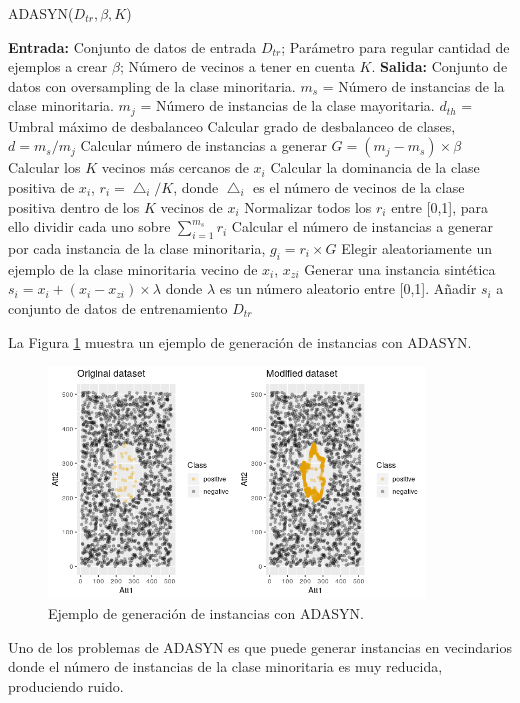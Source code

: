 \begin{algorithm}
	\caption{ADASYN($D_{tr}, \beta, K$)}
	\label{algo:adasyn}
	\begin{algorithmic}[0]
		\State \textbf{Entrada:} Conjunto de datos de entrada $D_{tr}$; Parámetro para regular cantidad de ejemplos a crear $\beta$; Número de vecinos a tener en cuenta $K$.
		\State \textbf{Salida:} Conjunto de datos con oversampling de la clase minoritaria.
		\State $m_s$ = Número de instancias de la clase minoritaria.
		\State $m_j$ = Número de instancias de la clase mayoritaria.
		\State $d_{th}$ = Umbral máximo de desbalanceo
		\State Calcular grado de desbalanceo de clases, $d = m_s/m_j$
			\State Calcular número de instancias a generar $G = (m_j - m_s) \times \beta$
				\State Calcular los $K$ vecinos más cercanos de $x_i$
				\State Calcular la dominancia de la clase positiva de $x_i$, $r_i = \bigtriangleup_i / K$, donde $\bigtriangleup_i$ es el número de vecinos de la clase positiva dentro de los $K$ vecinos de $x_i$
			\EndFor
			\State Normalizar todos los $r_i$ entre [0,1], para ello dividir cada uno sobre $\sum_{i=1}^{m_s} r_i$
			\State Calcular el número de instancias a generar por cada instancia de la clase minoritaria, $g_i = r_i \times G$
					\State Elegir aleatoriamente un ejemplo de la clase minoritaria vecino de $x_i$, $x_{zi}$
					\State Generar una instancia sintética $s_i = x_i + (x_i - x_{zi}) \times \lambda$ donde $\lambda$ es un número aleatorio entre [0,1].
					\State Añadir $s_i$ a conjunto de datos de entrenamiento $D_{tr}$
				\EndFor
			\EndFor
		\EndIf
	\end{algorithmic}
\end{algorithm}



La Figura \ref{fig:43} muestra un ejemplo de generación de instancias con ADASYN.\newline

\begin{figure}[H]
	\centering
	\includegraphics[width=100mm]{imagenes/ADASYN_comparison.png}
	\caption{Ejemplo de generación de instancias con ADASYN.}
	\label{fig:43}
\end{figure}
\verticalspace

Uno de los problemas de ADASYN es que puede generar instancias en vecindarios donde el número de instancias de la clase minoritaria es muy reducida, produciendo ruido.
